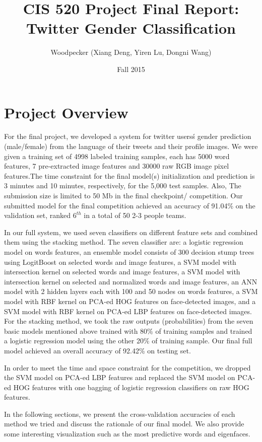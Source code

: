 \documentclass[english]{article}
\title{CIS 520 Project Final Report: Twitter Gender Classification}
\author{Woodpecker (Xiang Deng, Yiren Lu, Dongni Wang)}
\date{Fall 2015}
\begin{document}
\maketitle
\section{Project Overview}
\indent \indent For the final project, we developed a system for twitter users\'s gender prediction (male/female) from the language of their tweets and their profile images. We were given a training set of 4998 labeled training samples, each has 5000 word features, 7 pre-extracted image features and 30000 raw RGB image pixel features.The time constraint for the final model(s) initialization and prediction is 3 minutes and 10 minutes, respectively, for the 5,000 test samples. Also, The submission size is limited to 50 Mb in the final checkpoint/ competition. Our submitted model for the final competition achieved an accuracy of 91.04\% on the validation set, ranked $6^{th}$ in a total of 50 2-3 people teams. \par
In our full system, we used seven classifiers on different feature sets and combined them using the stacking method.
The seven classifier are: a logistic regression model on words features, an ensemble model consists of 300 decision stump trees using LogitBoost on selected words and image features, a SVM model with intersection kernel on selected words and image features, a SVM model with intersection kernel on selected and normalized words and image features, an ANN model with 2 hidden layers each with 100 and 50 nodes on words features, a SVM model with RBF kernel on PCA-ed HOG features on face-detected images, and a SVM model with RBF kernel on PCA-ed LBP features on face-detected images. For the stacking method, we took the raw outputs (probabilities) from the seven basic models mentioned above trained with 80\% of training samples and trained a logistic regression model using the other 20\% of training sample. Our final full model achieved an overall accuracy of 92.42\% on testing set. \par
In order to meet the time and space constraint for the competition, we dropped the SVM model on PCA-ed LBP features and replaced the SVM model on PCA-ed HOG features with one bagging of logistic regression classifiers on raw HOG features. \par
In the following sections, we present the cross-validation accuracies of each method we tried and discuss the rationale of our final model. We also provide some interesting visualization such as the most predictive words and eigenfaces. 
\end{document}
